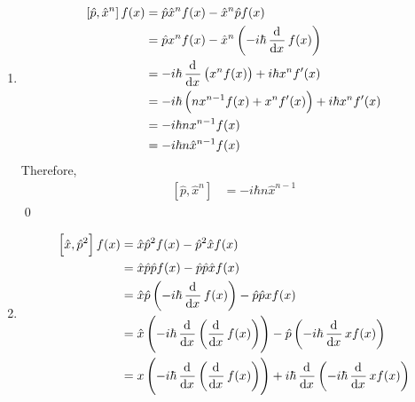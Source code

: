 \documentclass[fleqn, a4paper, 11pt, oneside]{amsart}
\theoremstyle{definition}
\theoremstyle{theorem}
\begin{document}
\begin{question}
	\begin{enumerate}[leftmargin=*]
		\item
			\begin{align*}
				\left[ \hat{p},\hat{x}^n \right]f(x) & = \hat{p} \hat{x}^n f(x) - \hat{x}^n \hat{p} f(x)                          \\
                                                                     & = \hat{p} x^n f(x) - \hat{x}^n \left( -i \hbar \dod{}{x}f(x) \right)       \\
                                                                     & = -i \hbar \dod{}{x}\left( x^n f(x) \right) + i \hbar x^n f'(x)            \\
                                                                     & = -i \hbar \left( n x^{n - 1} f(x) + x^n f'(x) \right) + i \hbar x^n f'(x) \\
                                                                     & = -i \hbar n x^{n - 1} f(x)                                                \\
                                                                     & = -i \hbar n \hat{x}^{n - 1} f(x)
			\end{align*}
			Therefore,
			\begin{align*}
				\left[ \hat{p},\hat{x}^n \right] & = -i \hbar n \hat{x}^{n - 1}
			\end{align*}
			\qed
		\item
			\begin{align*}
				\left[ \hat{x},\hat{p}^2 \right]f(x) & = \hat{x} \hat{p}^2 f(x) - \hat{p}^2 \hat{x} f(x)                                                                               \\
                                                                     & = \hat{x} \hat{p} \hat{p} f(x) - \hat{p} \hat{p} \hat{x} f(x)                                                                   \\
                                                                     & = \hat{x} \hat{p} \left( -i \hbar \dod{}{x} f(x) \right) - \hat{p} \hat{p} x f(x)                                               \\
                                                                     & = \hat{x} \left( -i \hbar \dod{}{x}\left( \dod{}{x} f(x) \right) \right) - \hat{p} \left( -i \hbar \dod{}{x} x f(x) \right)     \\
                                                                     & = x \left( -i \hbar \dod{}{x}\left( \dod{}{x} f(x) \right) \right) + i \hbar \dod{}{x} \left( -i \hbar \dod{}{x} x f(x) \right) \\

\end{align*}
\end{enumerate}
\end{question}
\end{document}
